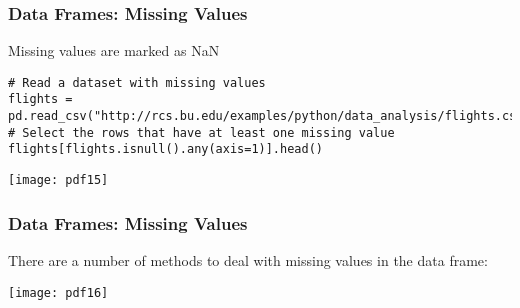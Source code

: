 \begin{frame}[fragile]
\frametitle{Data Frames: Missing Values}
Missing values are marked as NaN
\begin{lstlisting}
# Read a dataset with missing values
flights = pd.read_csv("http://rcs.bu.edu/examples/python/data_analysis/flights.csv")
# Select the rows that have at least one missing value
flights[flights.isnull().any(axis=1)].head()
\end{lstlisting}

\begin{center}
\texttt{[image: pdf15]}
\end{center}
\end{frame}

\begin{frame}[fragile]
\frametitle{Data Frames: Missing Values}
There are a number of methods to deal with missing values in the data frame:
\begin{center}
\texttt{[image: pdf16]}
\end{center}
\end{frame}





